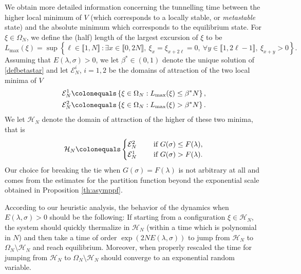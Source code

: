 \documentclass[reqno,11pt]{amsart}
\numberwithin{equation}{section}
\newcommand{\gO}{\Omega}
\newcommand{\gl}{\lambda}
\newcommand{\cH}{{\ensuremath{\mathcal H}} }
\newcommand{\lint}{\llbracket}
\newcommand{\rint}{\rrbracket}
\begin{document}
We obtain  more detailed information concerning the tunnelling time between the higher local minimum of $V$ (which corresponds to a locally stable, or \textit{metastable} state) and the absolute  minimum which corresponds to the equilibrium state.
For $\xi\in \Omega_N$, we define the (half) length of the largest excursion of $\xi$ to be
\begin{equation}\label{def:biggestjump}
L_{\max}(\xi) = \sup \left\{ \ell \in \lint 1, N \rint\  : \exists x \in \lint 0, 2N \rint,  \ \xi_{x}=\xi_{x+2 \ell}=0, \  \forall y \in \lint 1, 2\ell-1\rint, \  \xi_{x+y}>0  \right\}.
\end{equation}
Assuming that $E(\gl,\sigma)>0$, we let $\beta^*\in(0,1)$ denote the unique solution of \eqref{defbetastar} and let  $\mathcal{E}_N^i$, $i=1,2$ be the domains of attraction of the two local minima of $V$
\begin{equation}
\begin{aligned}
\mathcal{E}_N^1 & \colonequals \left\{ \xi \in \Omega_N: L_{\max}(\xi) \le \beta^* N \right\},\\
\mathcal{E}_N^2  &\colonequals \left\{ \xi \in \Omega_N: L_{\max}(\xi)>  \beta^* N \right\}.\label{partitionintwo}
\end{aligned}
\end{equation}
We let $\cH_N$ denote the domain of attraction of the  higher of these two minima, that is
\begin{equation}\label{def:cHN}
\cH_N \colonequals\begin{cases}
\mathcal{E}_N^2   \quad  & \text{ if } G(\sigma)\leq F(\lambda),\\
\mathcal{E}_N^1   \quad  & \text{ if } G(\sigma)>F(\lambda).
\end{cases}
\end{equation}
Our choice for breaking the tie when  $G(\sigma)= F(\lambda)$ is not arbitrary at all and comes from the estimates for the partition function beyond the exponential scale obtained in Proposition  \ref{th:asymppf}.

\medskip

According to our heuristic analysis, the behavior of the dynamics when $E(\gl,\sigma)>0$ should be the following: If starting from a configuration $\xi\in \cH_N$, the system should quickly thermalize in $\cH_N$ (within a time which is polynomial in $N$) and then take a time of order $\exp( 2NE(\gl,\sigma) )$ to jump from $\cH_N$ to $\gO_N\setminus \cH_N$ and reach equilibrium. Moreover, when properly rescaled
the time for jumping from $\cH_N$ to $\gO_N\setminus \cH_N$ should converge to an exponential random variable.
\end{document}
